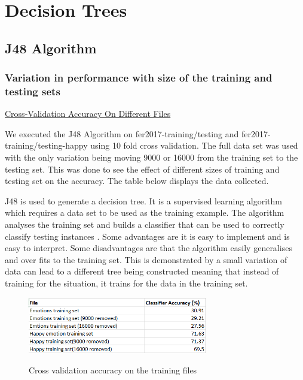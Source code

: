 \section{Decision Trees}
\label{sec:dt}


\subsection{J48 Algorithm}
\label{sec:dt:j48}
\subsubsection{Variation in performance with size of the training and testing sets}
\raggedright\underline{Cross-Validation Accuracy On Different Files}


We executed the J48 Algorithm on fer2017-training/testing and fer2017-training/testing-happy using 10 fold cross validation. The full data set was used with the only variation being moving  9000 or 16000 from the training set to the testing set. This was done to see the effect of different sizes of training and testing set on the accuracy. The table below displays the data collected.

J48 is used to generate a decision tree. It is a supervised learning algorithm which requires a data set to be used as the training example. The algorithm analyses the training set and builds a classifier that can be used to correctly classify testing instances \autocite{octaviansima2013}. Some advantages are it is easy to implement and is easy to interpret. Some disadvantages are that the algorithm easily generalises and over fits to the training set. This is demonstrated by a small variation of data can lead to a different tree being constructed meaning that instead of training for the situation, it trains for the data in the training set.


\begin{figure}[hbt!]
	\centering
      \includegraphics[width=0.7\textwidth]{imgs/J48/CVTraining.png} \\
	\caption{Cross validation accuracy on the training files}
	\label{fig:dt:CVTraining_table}
\end{figure}


